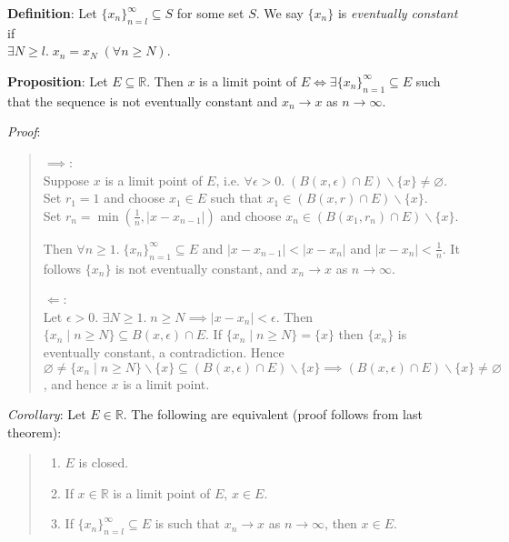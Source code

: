 \documentclass[11pt]{article}
\begin{document}
\textbf{Definition}: Let $\{x_n\}_{n=l}^\infty \subseteq S$ for some set $S$. We say $\{x_n\}$ is \emph{eventually constant} if\\
$\exists N \geq l.\; x_n = x_N\; (\forall n \geq N)$. 

\textbf{Proposition}: Let $E \subseteq \mathbb{R}$. Then $x$ is a limit point of $E \iff \exists \{x_n\}_{n=1}^\infty \subseteq E$ such that the sequence is not eventually constant and $x_n \to x$ as $n \to \infty$.

\emph{Proof}:
\begin{quote}\vspace{-0.3cm}
$\implies$:\\
Suppose $x$ is a limit point of $E$, i.e. $\forall \epsilon > 0.\; (B(x, \epsilon) \cap E) \backslash \{x\} \neq \varnothing$. Set $r_1 = 1$ and choose $x_1 \in E$ such that $x_1 \in (B(x, r) \cap E) \backslash \{x\}$.\\
Set $r_n = \min(\frac{1}{n}, |x-x_{n-1}|)$ and choose $x_n \in (B(x_1, r_n) \cap E) \backslash \{x\}$.

Then $\forall n \geq 1.\; \{x_n\}_{n=1}^\infty \subseteq E$ and $|x-x_{n-1}| < |x-x_n|$ and $|x-x_n| < \frac{1}{n}$. It follows $\{x_n\}$ is not eventually constant, and $x_n \to x$ as $n \to \infty$.

$\Longleftarrow$:\\
Let $\epsilon > 0$. $\exists N \geq 1.\; n \geq N \implies |x-x_n| < \epsilon$. Then $\{x_n \mid n \geq N\} \subseteq B(x, \epsilon) \cap E$. If $\{x_n \mid n \geq N\} = \{x\}$ then $\{x_n\}$ is eventually constant, a contradiction. Hence $\varnothing \neq \{x_n \mid n \geq N\} \backslash \{x\} \subseteq (B(x, \epsilon) \cap E) \backslash \{x\} \implies (B(x, \epsilon) \cap E) \backslash \{x\} \neq \varnothing$, and hence $x$ is a limit point.
\end{quote}

\emph{Corollary}: Let $E \in \mathbb{R}$. The following are equivalent (proof follows from last theorem):
\begin{quote}\vspace{-0.3cm}
	\begin{enumerate}
	\item $E$ is closed.
	\item If $x \in \mathbb{R}$ is a limit point of $E$, $x \in E$.
	\item If $\{x_n\}_{n=l}^\infty \subseteq E$ is such that $x_n \to x$ as $n \to \infty$, then $x \in E$.
	\end{enumerate}
\end{quote}
\end{document}
